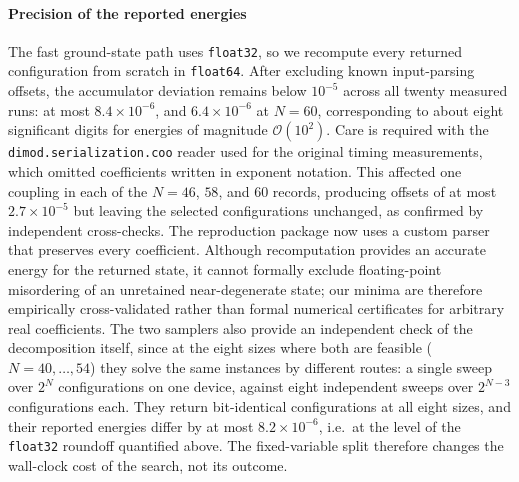 \documentclass[12pt,a4paper]{elsarticle}
\begin{document}
\paragraph{Precision of the reported energies}
The fast ground-state path uses \texttt{float32}, so we recompute every returned
configuration from scratch in \texttt{float64}. After excluding known input-parsing
offsets, the accumulator deviation remains below $10^{-5}$ across all twenty
measured runs: at most $8.4\times10^{-6}$, and $6.4\times10^{-6}$ at $N=60$,
corresponding to about eight significant digits for energies of magnitude
$\mathcal{O}(10^2)$. Care is required with the \texttt{dimod.serialization.coo}
reader used for the original timing measurements, which omitted coefficients written
in exponent notation. This affected one coupling in each of the $N=46$, $58$,
and $60$ records, producing offsets of at most $2.7\times10^{-5}$ but leaving the
selected configurations unchanged, as confirmed by independent cross-checks. The
reproduction package now uses a custom parser that preserves every coefficient.
Although recomputation provides an accurate energy for the returned state,
it cannot formally exclude floating-point misordering of an unretained
near-degenerate state; our minima are therefore empirically cross-validated rather
than formal numerical certificates for arbitrary real coefficients.
The two samplers also provide an independent check of the decomposition itself,
since at the eight sizes where both are feasible ($N=40,\dots,54$) they solve the
same instances by different routes: a single sweep over $2^{N}$ configurations on
one device, against eight independent sweeps over $2^{N-3}$ configurations each.
They return bit-identical configurations at all eight sizes, and their reported
energies differ by at most $8.2\times 10^{-6}$, i.e.\ at the level of the
\texttt{float32} roundoff quantified above. The fixed-variable split therefore
changes the wall-clock cost of the search, not its outcome.
\end{document}
